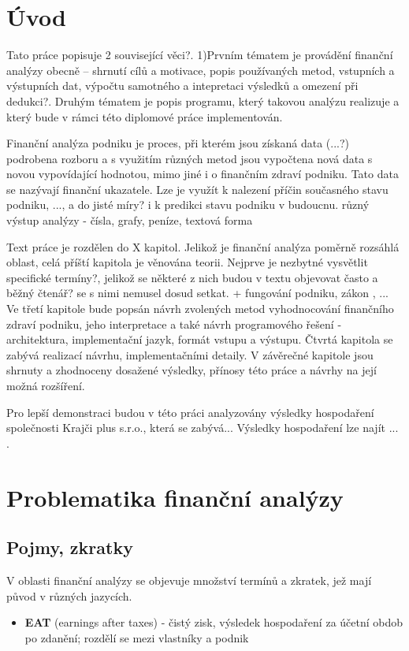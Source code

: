 \chapter{Úvod}
Tato práce popisuje 2 související věci?. 
1)Prvním tématem je provádění finanční analýzy obecně -- shrnutí cílů a motivace, popis používaných metod, vstupních a výstupních dat, výpočtu samotného a intepretaci výsledků a omezení při dedukci?. Druhým tématem je popis programu, který takovou analýzu realizuje a který bude v rámci této diplomové práce implementován.

Finanční analýza podniku je proces, při kterém jsou získaná data (...?) podrobena rozboru a s využitím různých metod jsou vypočtena nová data s novou vypovídající hodnotou, mimo jiné i o finančním zdraví podniku. Tato data se nazývají finanční ukazatele. Lze je využít k nalezení příčin současného stavu podniku, ..., a do jisté míry? i k predikci stavu podniku v budoucnu.
různý výstup analýzy - čísla, grafy, peníze, textová forma

Text práce je rozdělen do X kapitol. Jelikož je finanční analýza poměrně rozsáhlá oblast, celá příští kapitola je věnována teorii. Nejprve je nezbytné vysvětlit specifické termíny?, jelikož se některé z nich budou v textu objevovat často a běžný čtenář? se s nimi nemusel dosud setkat. + fungování podniku, zákon , ...
Ve třetí kapitole bude popsán návrh zvolených metod vyhodnocování finančního zdraví podniku, jeho interpretace a také návrh programového řešení - architektura, implementační jazyk, formát vstupu a výstupu. Čtvrtá kapitola se zabývá realizací návrhu, implementačními detaily. V závěrečné kapitole jsou shrnuty a zhodnoceny dosažené výsledky, přínosy této práce a návrhy na její možná rozšíření.

Pro lepší demonstraci budou v této práci analyzovány výsledky hospodaření společnosti Krajči plus s.r.o., která se zabývá... Výsledky hospodaření lze najít ... .

\chapter{Problematika finanční analýzy}


\section{Pojmy, zkratky}
V oblasti finanční analýzy se objevuje množství termínů a zkratek, jež mají původ v různých jazycích.
\begin{itemize}
	\item \textbf{EAT} (earnings after taxes) - čistý zisk, výsledek hospodaření za účetní obdob po zdanění; rozdělí se mezi vlastníky a podnik
\end{itemize}

